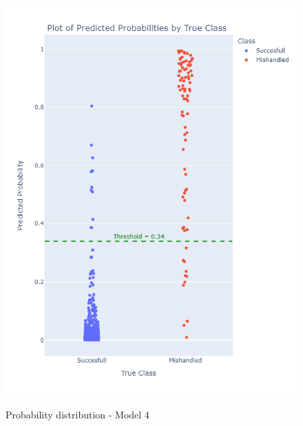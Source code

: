 \documentclass[12pt]{article}
\begin{document}
\begin{figure}
\begin{minipage}[c]{0.4\linewidth}
    \includegraphics[width=1\textwidth]{Probability_distribution_Model 4.png}\\
    \caption{Probability distribution - Model 4}
\end{minipage}%
\end{figure}
\FloatBarrier
\end{document}
